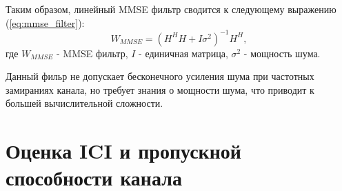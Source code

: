 \noindent Таким образом, линейный MMSE фильтр сводится к следующему выражению (\ref{eq:mmse_filter}):
\begin{equation}
    W_{MMSE} = (H^H H + I \sigma^2)^{-1} H^H,
    \label{eq:mmse_filter}
\end{equation}
где $W_{MMSE}$ - MMSE фильтр, $I$ - единичная матрица, $\sigma^2$ - мощность шума.

Данный фильр не допускает бесконечного усиления шума при частотных замираниях канала,
но требует знания о мощности шума, что приводит к большей вычислительной сложности.



\section{Оценка ICI и пропускной способности канала}






